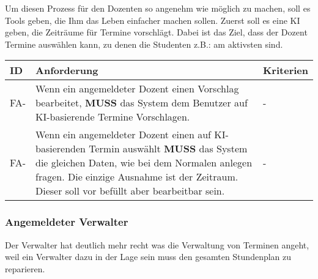 \newpage

Um diesen Prozess für den Dozenten so angenehm wie möglich zu machen, soll es Tools geben, die Ihm das Leben einfacher machen sollen. Zuerst soll es eine KI geben, die Zeiträume für Termine vorschlägt. Dabei ist das Ziel, dass der Dozent Termine auswählen kann, zu denen die Studenten z.B.: am aktivsten sind. 

\vspace{12pt}

\begin{tabular} {|p{}|p{11cm}|p{}|}
	\hline
	ID & Anforderung & Kriterien \\
	\hline
	FA-
	& Wenn ein angemeldeter Dozent einen Vorschlag bearbeitet, \textbf{MUSS} das System dem Benutzer auf KI-basierende Termine Vorschlagen. 
	& - \\
	\hline
	FA-
	& Wenn ein angemeldeter Dozent einen auf KI-basierenden Termin auswählt \textbf{MUSS} das System die gleichen Daten, wie bei dem Normalen anlegen fragen. Die einzige Ausnahme ist der Zeitraum. Dieser soll vor befüllt aber bearbeitbar sein. 
	& - \\
	\hline
\end{tabular}


\newpage

\subsubsection{Angemeldeter Verwalter}
Der Verwalter hat deutlich mehr recht was die Verwaltung von Terminen angeht, weil ein Verwalter dazu in der Lage sein muss den gesamten Stundenplan zu reparieren. 

\vspace{12pt}


